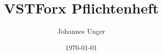\documentclass{scrartcl}
\title{VSTForx Pflichtenheft}
\author{Johannes Unger}
\date{\today}
\begin{document}
\maketitle
\tableofcontents

\newcommand{\neupunkt}[1]{\newcounter{#1}}
\newcommand{\punkt}[2][10]{\paragraph{/#2\arabic{#2}/}\addtocounter{#2}{#1}}
\newpage





\end{document}
